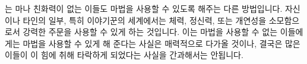 \documentclass{report}
\begin{document}
	는 마나 친화력이 없는 이들도 마법을 사용할 수 있도록 해주는 다른 방법입니다. 자신이나 타인의 일부, 특히 이야기꾼의 세계에서는 체력, 정신력, 또는 개연성을 소모함으로서 강력한 주문을 사용할 수 있게 하는 것입니다. 이는 마법을 사용할 수 없는 이들에게는 마법을 사용할 수 있게 해 준다는 사실은 매력적으로 다가올 것이나, 결국은 많은 이들이 이 힘에 취해 타락하게 되었다는 사실을 간과해서는 안됩니다.
\end{document}
